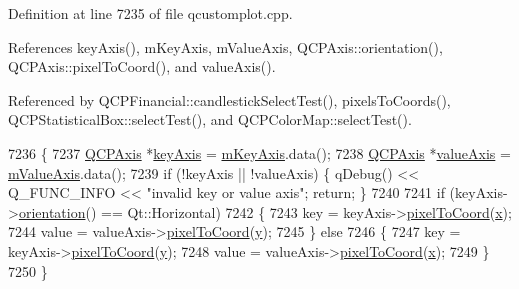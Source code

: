 Definition at line 7235 of file qcustomplot.\+cpp.



References key\+Axis(), m\+Key\+Axis, m\+Value\+Axis, Q\+C\+P\+Axis\+::orientation(), Q\+C\+P\+Axis\+::pixel\+To\+Coord(), and value\+Axis().



Referenced by Q\+C\+P\+Financial\+::candlestick\+Select\+Test(), pixels\+To\+Coords(), Q\+C\+P\+Statistical\+Box\+::select\+Test(), and Q\+C\+P\+Color\+Map\+::select\+Test().


\begin{DoxyCode}
7236 \{
7237   \hyperlink{class_q_c_p_axis}{QCPAxis} *\hyperlink{class_q_c_p_abstract_plottable_a72c7a09c22963f2c943f07112b311103}{keyAxis} = \hyperlink{class_q_c_p_abstract_plottable_a426f42e254d0f8ce5436a868c61a6827}{mKeyAxis}.data();
7238   \hyperlink{class_q_c_p_axis}{QCPAxis} *\hyperlink{class_q_c_p_abstract_plottable_a3106f9d34d330a6097a8ec5905e5b519}{valueAxis} = \hyperlink{class_q_c_p_abstract_plottable_a2901452ca4aea911a1827717934a4bda}{mValueAxis}.data();
7239   \textcolor{keywordflow}{if} (!keyAxis || !valueAxis) \{ qDebug() << Q\_FUNC\_INFO << \textcolor{stringliteral}{"invalid key or value axis"}; \textcolor{keywordflow}{return}; \}
7240   
7241   \textcolor{keywordflow}{if} (keyAxis->\hyperlink{class_q_c_p_axis_a57483f2f60145ddc9e63f3af53959265}{orientation}() == Qt::Horizontal)
7242   \{
7243     key = keyAxis->\hyperlink{class_q_c_p_axis_ae9289ef7043b9d966af88eaa95b037d1}{pixelToCoord}(\hyperlink{_comparision_pictures_2_createtest_image_8m_a9336ebf25087d91c818ee6e9ec29f8c1}{x});
7244     value = valueAxis->\hyperlink{class_q_c_p_axis_ae9289ef7043b9d966af88eaa95b037d1}{pixelToCoord}(\hyperlink{_comparision_pictures_2_createtest_image_8m_a2fb1c5cf58867b5bbc9a1b145a86f3a0}{y});
7245   \} \textcolor{keywordflow}{else}
7246   \{
7247     key = keyAxis->\hyperlink{class_q_c_p_axis_ae9289ef7043b9d966af88eaa95b037d1}{pixelToCoord}(\hyperlink{_comparision_pictures_2_createtest_image_8m_a2fb1c5cf58867b5bbc9a1b145a86f3a0}{y});
7248     value = valueAxis->\hyperlink{class_q_c_p_axis_ae9289ef7043b9d966af88eaa95b037d1}{pixelToCoord}(\hyperlink{_comparision_pictures_2_createtest_image_8m_a9336ebf25087d91c818ee6e9ec29f8c1}{x});
7249   \}
7250 \}
\end{DoxyCode}


